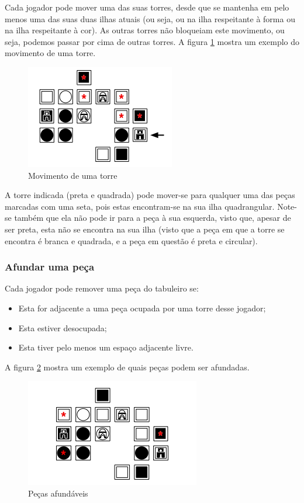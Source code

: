 \documentclass[a4paper]{article}
\begin{document}
Cada jogador pode mover uma das suas torres, desde que se mantenha em pelo menos uma das suas duas ilhas atuais (ou seja, ou na ilha respeitante à forma ou na ilha respeitante à cor). As outras torres não bloqueiam este movimento, ou seja, podemos passar por cima de outras torres.  A figura \ref{fig:towermovement} mostra um exemplo do movimento de uma torre.

\begin{figure}[h]
\centering
\includegraphics[scale=0.9]{towermovement.png}
\caption{Movimento de uma torre}
\label{fig:towermovement}
\end{figure}

A torre indicada (preta e quadrada) pode mover-se para qualquer uma das peças marcadas com uma seta, pois estas encontram-se na sua ilha quadrangular. Note-se também que ela não pode ir para a peça à sua esquerda, visto que, apesar de ser preta, esta não se encontra na sua ilha (visto que a peça em que a torre se encontra é branca e quadrada, e a peça em questão é preta e circular).

\subsubsection{Afundar uma peça}

Cada jogador pode remover uma peça do tabuleiro se:

\begin{itemize}
\item Esta for adjacente a uma peça ocupada por uma torre desse jogador;
\item Esta estiver desocupada;
\item Esta tiver pelo menos um espaço adjacente livre.
\end{itemize}

A figura \ref{fig:sinktile} mostra um exemplo de quais peças podem ser afundadas.

\begin{figure}[h]
\centering
\includegraphics[scale=0.9]{sinktile.png}
\caption{Peças afundáveis}
\label{fig:sinktile}
\end{figure}
\end{document}
